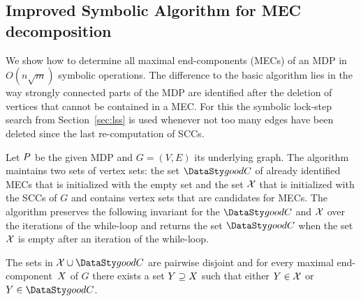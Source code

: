\subsection{Improved Symbolic Algorithm for MEC decomposition}

\smallskip{}
We show how to determine all maximal end-components (MECs) of an MDP 
in $O(n \sqrt{m})$ symbolic operations. The difference to the basic algorithm  lies in the way strongly connected parts
of the MDP are identified after the deletion of vertices that cannot be contained
in a MEC. For this the symbolic lock-step search from Section~\ref{sec:lss} is used whenever
not too many edges have been deleted since the last re-computation of SCCs.

Let $P$ be the given MDP and $G = (V, E)$ its underlying graph.
The algorithm maintains two sets of vertex sets: the set $\goodC$ of already
identified MECs that is initialized with the empty set and the set $\mathcal{X}$
that is initialized with the SCCs of $G$ and contains vertex sets that are
candidates for MECs. The algorithm preserves the 
following invariant for the $\goodC$ and $\mathcal{X}$ over the iterations 
of the while-loop and returns the set $\goodC$
when the set $\mathcal{X}$ is empty after an iteration of the while-loop.

\begin{invariant}\label{inv:meccontained}
The sets in $\mathcal{\ec} \cup \goodC$ are pairwise disjoint and
for every maximal end-component~$X$ of $G$ there exists a set $Y \supseteq X$
such that either $Y \in \mathcal{X}$ or $Y \in \goodC$.
\end{invariant}

